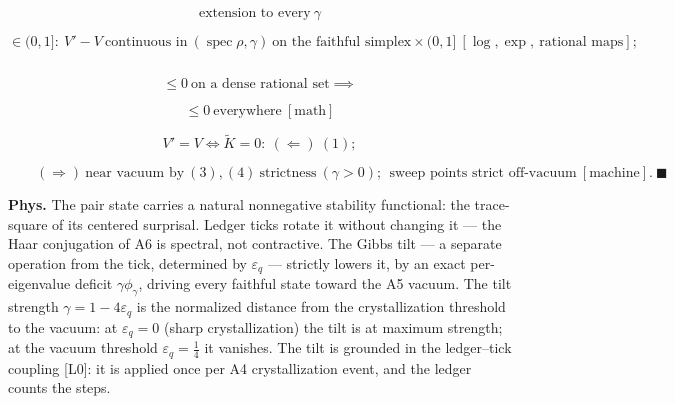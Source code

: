 \begin{theorem}
\[
\text{extension to every}\ \gamma
\]

\[
\in (0,1]:\ V'-V\ \text{continuous in}\ (\operatorname{spec}\rho,\gamma)\ \text{on the faithful simplex}\times(0,1]\ [\log,\exp,\ \text{rational maps}];
\]

\[
\ \
\]

\[
\le 0\ \text{on a dense rational set}\implies
\]

\[
\le 0\ \text{everywhere}\ [\text{math}]
\]

\[
V'=V\iff\tilde K=0:\ (\Leftarrow)\ (1);
\]

\[
\qquad (\Rightarrow)\ \text{near vacuum by}\ (3),(4)\ \text{strictness}\ (\gamma>0);\ \ \text{sweep points strict off-vacuum}\ [\text{machine}].\ \blacksquare
\]

\textbf{Phys.} The pair state carries a natural nonnegative stability functional: the trace-square of its centered surprisal. Ledger ticks rotate it without changing it — the Haar conjugation of A6 is spectral, not contractive. The Gibbs tilt — a separate operation from the tick, determined by $\varepsilon_q$ — strictly lowers it, by an exact per-eigenvalue deficit $\gamma\phi_\gamma$, driving every faithful state toward the A5 vacuum. The tilt strength $\gamma=1-4\varepsilon_q$ is the normalized distance from the crystallization threshold to the vacuum: at $\varepsilon_q=0$ (sharp crystallization) the tilt is at maximum strength; at the vacuum threshold $\varepsilon_q=\tfrac14$ it vanishes. The tilt is grounded in the ledger–tick coupling [L0]: it is applied once per A4 crystallization event, and the ledger counts the steps.

\end{theorem}

